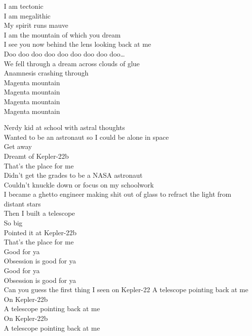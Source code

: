 I am tectonic \\
I am megalithic \\
My spirit runs mauve \\
I am the mountain of which you dream \\
I see you now behind the lens looking back at me \\

Doo doo doo doo doo doo doo doo doo… \\
We fell through a dream across clouds of glue \\
Anamnesis crashing through \\

Magenta mountain \\
Magenta mountain \\
Magenta mountain \\
Magenta mountain \\




Nerdy kid at school with astral thoughts \\
Wanted to be an astronaut so I could be alone in space \\

Get away \\
Dreamt of Kepler-22b \\
That's the place for me \\

Didn't get the grades to be a NASA astronaut \\
Couldn't knuckle down or focus on my schoolwork \\
I became a ghetto engineer making shit out of glass to refract the light from distant stars \\
Then I built a telescope \\
So big \\
Pointed it at Kepler-22b \\
That's the place for me \\

Good for ya \\
Obsession is good for ya \\
Good for ya \\
Obsession is good for ya \\

Can you guess the first thing I seen on Kepler-22
A telescope pointing back at me \\
On Kepler-22b \\
A telescope pointing back at me \\
On Kepler-22b \\
A telescope pointing back at me \\

